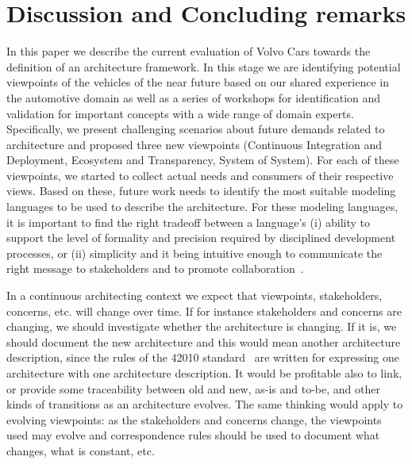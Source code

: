 \section{Discussion and Concluding remarks}\label{sec:conclusion}

In this paper we describe the current evaluation of Volvo Cars towards the definition of an architecture framework.
In this stage we are identifying potential viewpoints of the vehicles of the near future based on our shared experience in the automotive domain as well as a series of workshops for identification and validation for important concepts with a wide range of domain experts. 
Specifically, we present challenging scenarios about future demands related to architecture and proposed three new viewpoints (Continuous Integration and Deployment, Ecosystem and Transparency, System of System).
For each of these viewpoints, we started to collect actual needs and consumers of their respective views. 
Based on these, future work needs to identify the most suitable modeling languages to be used to describe the architecture. 
For these modeling languages, it is important to find the right tradeoff between a language's
(i) ability to support the level of formality and precision required by disciplined development processes, or
(ii) simplicity and it being intuitive enough to communicate the right message to stakeholders and to promote collaboration~\cite{whatindustrywants,IEEESoftwarePatrizio}.

In a continuous architecting context we expect that viewpoints, stakeholders, concerns, etc. will change over time. If for instance stakeholders and concerns are changing, we should investigate whether the architecture is changing.
If it is, we should document the new architecture and this would mean another architecture description, since the rules of the 42010 standard~\cite{42010} are written for expressing one architecture with one architecture description.
It would be profitable also to link, or provide some traceability between old and new, as-is and to-be, and other kinds of transitions as an architecture evolves. 
The same thinking would apply to evolving viewpoints: as the stakeholders and concerns change, the viewpoints used may evolve and correspondence rules should be used to document what changes, what is constant, etc.


